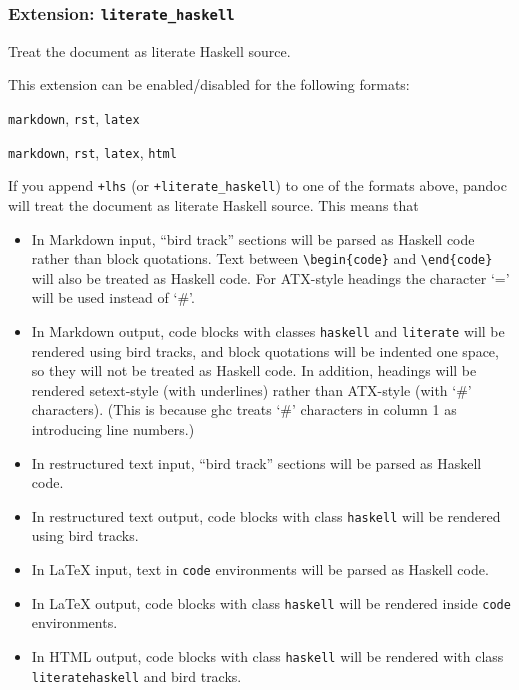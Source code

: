 \documentclass[
]{article}
\providecommand{\tightlist}{%
  \setlength{\itemsep}{0pt}\setlength{\parskip}{0pt}}
\begin{document}
\hypertarget{extension-literate_haskell}{%
\subsubsection{\texorpdfstring{Extension:
\texttt{literate\_haskell}}{Extension: literate\_haskell}}\label{extension-literate_haskell}}

Treat the document as literate Haskell source.

This extension can be enabled/disabled for the following formats:

\begin{description}
\tightlist
\item[input formats]
\texttt{markdown}, \texttt{rst}, \texttt{latex}
\item[output formats]
\texttt{markdown}, \texttt{rst}, \texttt{latex}, \texttt{html}
\end{description}

If you append \texttt{+lhs} (or \texttt{+literate\_haskell}) to one of
the formats above, pandoc will treat the document as literate Haskell
source. This means that

\begin{itemize}
\item
  In Markdown input, ``bird track'' sections will be parsed as Haskell
  code rather than block quotations. Text between
  \texttt{\textbackslash{}begin\{code\}} and
  \texttt{\textbackslash{}end\{code\}} will also be treated as Haskell
  code. For ATX-style headings the character `=' will be used instead of
  `\#'.
\item
  In Markdown output, code blocks with classes \texttt{haskell} and
  \texttt{literate} will be rendered using bird tracks, and block
  quotations will be indented one space, so they will not be treated as
  Haskell code. In addition, headings will be rendered setext-style
  (with underlines) rather than ATX-style (with `\#' characters). (This
  is because ghc treats `\#' characters in column 1 as introducing line
  numbers.)
\item
  In restructured text input, ``bird track'' sections will be parsed as
  Haskell code.
\item
  In restructured text output, code blocks with class \texttt{haskell}
  will be rendered using bird tracks.
\item
  In LaTeX input, text in \texttt{code} environments will be parsed as
  Haskell code.
\item
  In LaTeX output, code blocks with class \texttt{haskell} will be
  rendered inside \texttt{code} environments.
\item
  In HTML output, code blocks with class \texttt{haskell} will be
  rendered with class \texttt{literatehaskell} and bird tracks.
\end{itemize}
\end{document}
